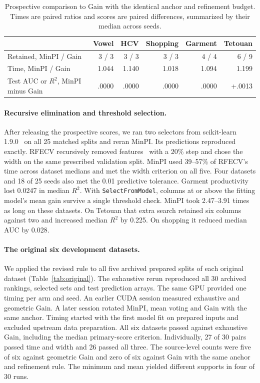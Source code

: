 \begin{table}[htbp]
\centering
\caption{Prospective comparison to Gain with the identical anchor and refinement budget. Times are paired ratios and scores are paired differences, summarized by their median across seeds.}
\label{tab:matched}
\small
\begin{tabular}{lrrrrr}
\toprule
 & Vowel & HCV & Shopping & Garment & Tetouan\\
\midrule
Retained, MinPI / Gain & 3 / 3 & 3 / 3 & 3 / 3 & 4 / 4 & 6 / 9\\
Time, MinPI / Gain & 1.044 & 1.140 & 1.018 & 1.094 & 1.199\\
Test AUC or $R^2$, MinPI minus Gain & .0000 & .0000 & .0000 & .0000 & +.0013\\
\bottomrule
\end{tabular}
\end{table}

\paragraph{Recursive elimination and threshold selection.}
After releasing the prospective scores, we ran two selectors from scikit-learn 1.9.0~\citep{pedregosa2011sklearn} on all 25 matched splits and reran MinPI. Its predictions reproduced exactly. RFECV recursively removed features~\citep{guyon2002rfe} with a 20\% step and chose the width on the same prescribed validation split. MinPI used 39--57\% of RFECV's time across dataset medians and met the width criterion on all five. Four datasets and 18 of 25 seeds also met the 0.01 predictive tolerance. Garment productivity lost 0.0247 in median $R^2$. With \texttt{SelectFromModel}, columns at or above the fitting model's mean gain survive a single threshold check. MinPI took 2.47--3.91 times as long on these datasets. On Tetouan that extra search retained six columns against two and increased median $R^2$ by 0.225. On shopping it reduced median AUC by 0.028.

\paragraph{The original six development datasets.}
We applied the revised rule to all five archived prepared splits of each original dataset (Table~\ref{tab:original}). The exhaustive rerun reproduced all 30 archived rankings, selected sets and test prediction arrays. The same GPU provided one timing per arm and seed. An earlier CUDA session measured exhaustive and geometric Gain. A later session rotated MinPI, mean voting and Gain with the same anchor. Timing started with the first model fit on prepared inputs and excluded upstream data preparation. All six datasets passed against exhaustive Gain, including the median primary-score criterion. Individually, 27 of 30 pairs passed time and width and 26 passed all three. The source-level counts were five of six against geometric Gain and zero of six against Gain with the same anchor and refinement rule. The minimum and mean yielded different supports in four of 30 runs.

